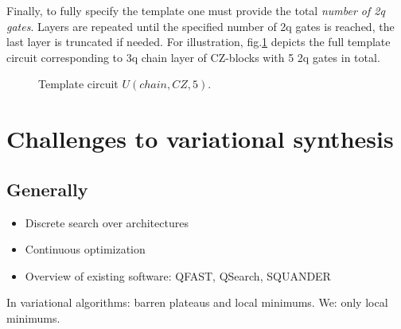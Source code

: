 \documentclass[amsfonts, amssymb, aps, nofootinbib]{revtex4-2}
\begin{document}
Finally, to fully specify the template one must provide the total \textit{number of 2q gates}. Layers are repeated until the specified number of 2q gates is reached, the last layer is truncated if needed. 
For illustration, fig.\ref{fig template example} depicts the full template circuit corresponding to 3q chain layer of CZ-blocks with 5 2q gates in total.

\begin{figure}[h!]
\caption{Template circuit $U(chain, CZ, 5)$.}
\label{fig template example}
\end{figure}



\section{Challenges to variational synthesis}
\subsection{Generally}
\begin{itemize}
	\item Discrete search over architectures 
	\item Continuous optimization
	\item Overview of existing software: QFAST, QSearch, SQUANDER
\end{itemize}
In variational algorithms: barren plateaus and local minimums. We: only local minimums.
\end{document}

